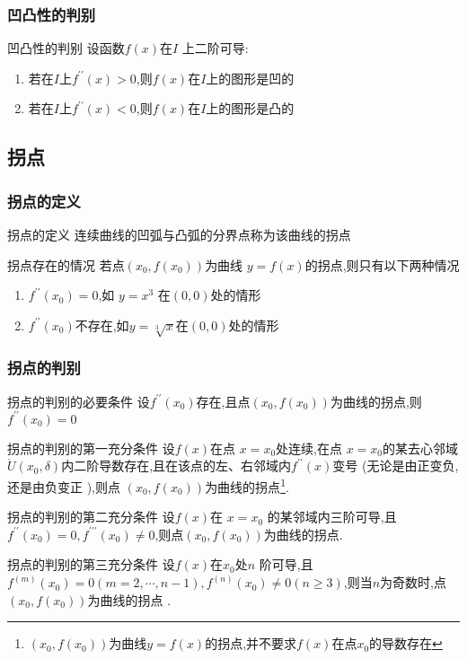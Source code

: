 \documentclass[8pt a4paper, oneside, UTF8]{ctexbook}  %
\begin{document}
\begin{sloppypar}
    \subsubsection{凹凸性的判别}
    \begin{defn}{凹凸性的判别}{}
        设函数$f(x)$在$I$ 上二阶可导:
        \begin{enumerate}
            \item 若在$I$上$f^{\prime\prime}(x)>0$,则$f(x)$在$I$上的图形是凹的
            \item 若在$I$上$f^{\prime\prime}(x)<$0,则$f(x)$在$I$上的图形是凸的
        \end{enumerate}
    \end{defn}
    \subsection{拐点}
    \subsubsection{拐点的定义}
    \begin{defn}{拐点的定义}{}
        连续曲线的凹弧与凸弧的分界点称为该曲线的拐点
    \end{defn}
    \begin{criterion}{拐点存在的情况}{}
        若点$(x_0,f(x_0))$为曲线 $y=f(x)$的拐点,则只有以下两种情况
        \begin{enumerate}
            \item $f^{\prime\prime}\left(x_{0}\right)=0$,如 $y=x^{3}$ 在$\left(0,0\right)$处的情形
            \item $f^{\prime\prime}(x_0)$不存在,如$y=\sqrt[3]{x}$在$(0,0)$处的情形
        \end{enumerate}
    \end{criterion}
    \subsubsection{拐点的判别}
    \begin{defn}{拐点的判别的必要条件}{}
        设$f^{\prime\prime}(x_0)$存在,且点$(x_0,f(x_0))$为曲线的拐点,则$f^{\prime\prime}(x_0)=0$
    \end{defn}
    \begin{defn}{拐点的判别的第一充分条件}{}
        设$f(x)$在点 $x=x_0$处连续,在点 $x=x_0$的某去心邻域$\mathring U(x_0,\delta)$内二阶导数存在,且在该点的左、右邻域内$f^{\prime\prime}(x)$变号 (无论是由正变负,还是由负变正 ),则点 $(x_0,f(x_0))$为曲线的拐点\footnote{$(x_0,f(x_0))$为曲线$y=f(x)$的拐点,并不要求$f(x)$在点$x_0$的导数存在}.
    \end{defn}
    \begin{defn}{拐点的判别的第二充分条件}{}
        设$f(x)$在 $x=x_0$ 的某邻域内三阶可导,且$f^{\prime\prime}(x_0)=0,f^{\prime\prime\prime}(x_0)\neq0$,则点$(x_0,f(x_0))$为曲线的拐点.
    \end{defn}
    \begin{defn}{拐点的判别的第三充分条件}{}
        设$f(x)$在$x_0$处$n$ 阶可导,且$f^{(m)}(x_0)=0(m=2,\cdots,n-1),f^{(n)}(x_0)\neq0(n\geqslant3)$,则当$n$为奇数时,点$(x_0,f(x_0))$为曲线的拐点 .
    \end{defn}    

\end{sloppypar}
\end{document}
